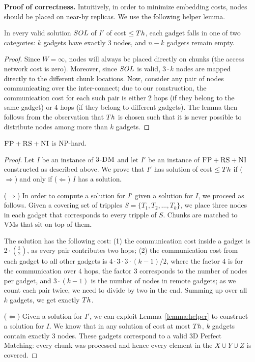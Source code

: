 \textbf{Proof of correctness.}
Intuitively, in order to minimize embedding costs,
nodes should be placed on near-by replicas. We use the following
helper lemma.
\begin{lemma}\label{lemma:helper}
In every valid solution $SOL$ of $I'$ of cost $\leq Th$, each gadget
falls in one of two categories:
$k$ gadgets have exactly
$3$ nodes, and $n-k$ gadgets remain empty.
\end{lemma}
\begin{proof}
Since $W=\infty$, nodes will always be placed
directly on chunks (the access network cost is zero).
Moreover, since
$SOL$ is valid, $3 \cdot k$ nodes are mapped
directly to the different chunk locations.
Now, consider any pair of nodes communicating over the
inter-connect; due to our construction, the communication cost
for each such pair is either
2 hops (if they belong to the same gadget) or 4 hops (if they belong
to different gadgets).
The lemma then follows from the observation that $Th$
is chosen such that it is never possible to distribute nodes
among more than $k$ gadgets.
\end{proof}

\begin{theorem}
$\textsc{FP}+\textsc{RS}+\textsc{NI}$ is NP-hard.
\end{theorem}
\begin{proof}
Let $I$ be an instance of $\textsc{3-DM}$ and let $I'$ be an instance of
$\textsc{FP}+\textsc{RS}+\textsc{NI}$ constructed as described above.
We prove that $I'$ has solution of cost $\leq Th$ if ($\Rightarrow$) and only if
($\Leftarrow$)
$I$ has a solution.

($\Rightarrow$) In order to compute a solution
for $I'$ given a solution for $I$, we proceed as follows.
Given a covering set of tripples $S = \{T_1, T_2, \ldots, T_k\}$, we place three nodes in each gadget that
corresponds to every tripple of $S$. Chunks are matched to VMs that sit on top of them.

The solution has the following cost:
(1) the communication cost inside a gadget is $2 \cdot {3 \choose 2}$,
  as every pair contributes two hops;
  (2) the communication cost from each gadget to all other gadgets is $4
  \cdot 3 \cdot 3 \cdot (k - 1) / 2$, where the factor $4$ is
  for the
  communication over $4$ hops, the factor $3$
  corresponds to the number of nodes per gadget, and
  $3 \cdot (k-1)$ is the number of nodes in remote gadgets;
  as we count each pair twice, we need to divide by two in the end.
Summing up over all $k$ gadgets, we get exactly $Th$.

($\Leftarrow$) Given a solution for $I'$,
we can exploit Lemma~\ref{lemma:helper} to construct a solution for $I$.
We know that in any solution of cost at most $Th$,
$k$ gadgets contain exactly 3 nodes. These gadgets correspond to a valid
3D Perfect Matching: every
chunk was processed and hence every element in the $X \cup Y \cup Z$ is covered.
\end{proof}

